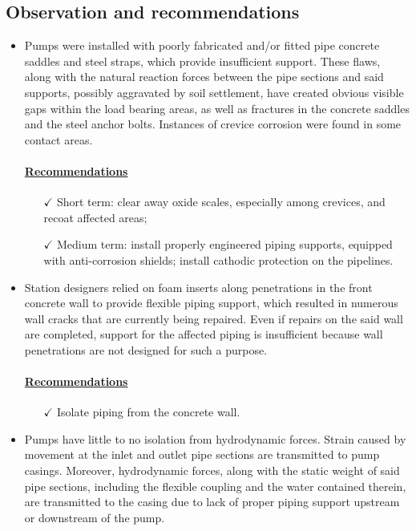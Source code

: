 \subsection{Observation and recommendations}
\begin{itemize}
\item Pumps were installed with poorly fabricated and/or fitted pipe concrete saddles and steel straps, which provide insufficient support. These flaws, along with the natural reaction forces between the pipe sections and said supports, possibly aggravated by soil settlement, have created obvious visible gaps within the load bearing areas, as well as fractures in the concrete saddles and the steel anchor bolts. Instances of crevice corrosion were found in some contact areas. 
\paragraph{\underline{Recommendations}}
\begin{itemize}
	\item [$\checkmark$] Short term: clear away oxide scales, especially among crevices, and recoat affected areas; 
	\item[$\checkmark$]  Medium term: install properly engineered piping supports, equipped with anti-corrosion shields; install cathodic protection on the pipelines.
\end{itemize}

\item Station designers relied on foam inserts along penetrations in the front concrete wall to provide flexible piping support, which resulted in numerous wall cracks that are currently being repaired. Even if repairs on the said wall are completed, support for the affected piping is insufficient because wall penetrations are not designed for such a purpose. 

\paragraph{\underline{Recommendations}}
\begin{itemize}
	\item [$\checkmark$] Isolate piping from the concrete wall. 
\end{itemize}

\item Pumps have little to no isolation from hydrodynamic forces. Strain caused by movement at the inlet and outlet pipe sections are transmitted to pump casings. Moreover, hydrodynamic forces, along with the static weight of said pipe sections, including the flexible coupling and the water contained therein, are transmitted to the casing due to lack of proper piping support upstream or downstream of the pump.


\end{itemize}
